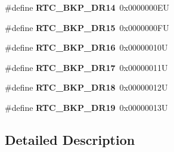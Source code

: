 \begin{DoxyCompactItemize}
\#define {\bfseries R\+T\+C\+\_\+\+B\+K\+P\+\_\+\+D\+R14}~0x0000000\+EU
\item 
\mbox{\label{group___r_t_c_ex___backup___registers___definitions_ga01ad7db765e52ecd13f24bb09db27789}} 
\#define {\bfseries R\+T\+C\+\_\+\+B\+K\+P\+\_\+\+D\+R15}~0x0000000\+FU
\item 
\mbox{\label{group___r_t_c_ex___backup___registers___definitions_ga767f5e169b56f4a2364deb705d322a7b}} 
\#define {\bfseries R\+T\+C\+\_\+\+B\+K\+P\+\_\+\+D\+R16}~0x00000010U
\item 
\mbox{\label{group___r_t_c_ex___backup___registers___definitions_gabba03a6ab599f5f45db95244500177ff}} 
\#define {\bfseries R\+T\+C\+\_\+\+B\+K\+P\+\_\+\+D\+R17}~0x00000011U
\item 
\mbox{\label{group___r_t_c_ex___backup___registers___definitions_ga9fc8a8a86892e0c517a56b2804b53006}} 
\#define {\bfseries R\+T\+C\+\_\+\+B\+K\+P\+\_\+\+D\+R18}~0x00000012U
\item 
\mbox{\label{group___r_t_c_ex___backup___registers___definitions_ga384af548d7386c490e6a65b2600c8c2b}} 
\#define {\bfseries R\+T\+C\+\_\+\+B\+K\+P\+\_\+\+D\+R19}~0x00000013U
\end{DoxyCompactItemize}


\subsection{Detailed Description}
